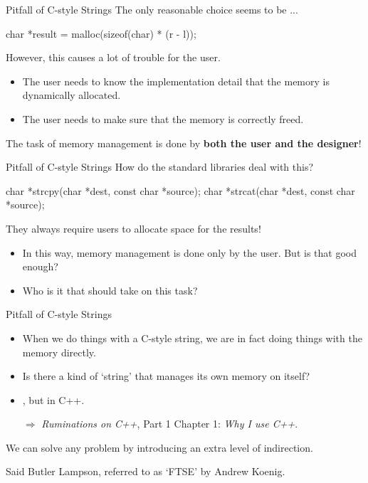 \documentclass[handout]{beamer}
\begin{document}
\begin{frame}[fragile]{Pitfall of C-style Strings}
    The only reasonable choice seems to be ...
    \begin{cpp}
char *result = malloc(sizeof(char) * (r - l));
    \end{cpp}
    \pause
    However, this causes a lot of trouble for the user.
    \begin{itemize}
        \item The user needs to know the implementation detail that the memory is dynamically allocated.
        \item The user needs to make sure that the memory is correctly freed.
    \end{itemize}
    \pause
    The task of memory management is done by \textbf{both the user and the designer}!
\end{frame}

\begin{frame}[fragile]{Pitfall of C-style Strings}
    How do the standard libraries deal with this?
    \pause
    \begin{cpp}
char *strcpy(char *dest, const char *source);
char *strcat(char *dest, const char *source);
    \end{cpp}
    They always require users to allocate space for the results!
    \pause
    \begin{itemize}
        \item In this way, memory management is done only by the user. But is that good enough?
        \item Who is it that should take on this task?
    \end{itemize}
\end{frame}

\begin{frame}[fragile]{Pitfall of C-style Strings}
    \begin{itemize}
        \item When we do things with a C-style string, we are in fact doing things with the memory directly.
        \item Is there a kind of `string' that manages its own memory on itself?
        \pause
        \item {}, but in C++.
        \item[\(\Rightarrow\)] \textit{Ruminations on C++}, Part 1 Chapter 1: \textit{Why I use C++}.
    \end{itemize}
    \begin{thm}
        We can solve any problem by introducing an extra level of indirection.
    \end{thm}
    Said Butler Lampson, referred to as `FTSE' by Andrew Koenig.
\end{frame}
\end{document}
